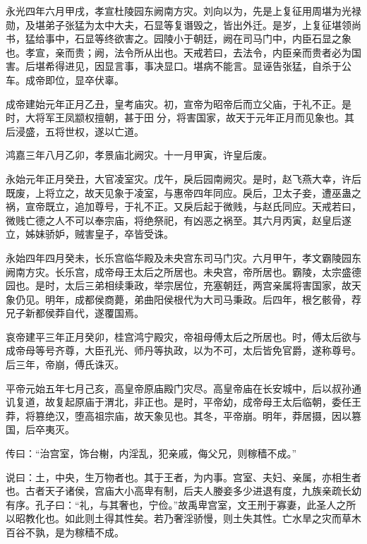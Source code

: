 \documentclass[12pt,UTF8]{ctexbook}
\begin{document}
永光四年六月甲戌，孝宣杜陵园东阙南方灾。刘向以为，先是上复征用周堪为光禄勋，及堪弟子张猛为太中大夫，石显等复谮毁之，皆出外迁。是岁，上复征堪领尚书，猛给事中，石显等终欲害之。园陵小于朝廷，阙在司马门中，内臣石显之象也。孝宣，亲而贵；阙，法令所从出也。天戒若曰，去法令，内臣亲而贵者必为国害。后堪希得进见，因显言事，事决显口。堪病不能言。显诬告张猛，自杀于公车。成帝即位，显卒伏辜。



成帝建始元年正月乙丑，皇考庙灾。初，宣帝为昭帝后而立父庙，于礼不正。是时，大将军王凤颛权擅朝，甚于田分，将害国家，故天于元年正月而见象也。其后浸盛，五将世权，遂以亡道。



鸿嘉三年八月乙卯，孝景庙北阙灾。十一月甲寅，许皇后废。



永始元年正月癸丑，大官凌室灾。戊午，戾后园南阙灾。是时，赵飞燕大幸，许后既废，上将立之，故天见象于凌室，与惠帝四年同应。戾后，卫太子妾，遭巫蛊之祸，宣帝既立，追加尊号，于礼不正。又戾后起于微贱，与赵氏同应。天戒若曰，微贱亡德之人不可以奉宗庙，将绝祭祀，有凶恶之祸至。其六月丙寅，赵皇后遂立，姊妹骄妒，贼害皇子，卒皆受诛。



永始四年四月癸未，长乐宫临华殿及未央宫东司马门灾。六月甲午，孝文霸陵园东阙南方灾。长乐宫，成帝母王太后之所居也。未央宫，帝所居也。霸陵，太宗盛德园也。是时，太后三弟相续秉政，举宗居位，充塞朝廷，两宫亲属将害国家，故天象仍见。明年，成都侯商薨，弟曲阳侯根代为大司马秉政。后四年，根乞骸骨，荐兄子新都侯莽自代，遂覆国焉。



哀帝建平三年正月癸卯，桂宫鸿宁殿灾，帝祖母傅太后之所居也。时，傅太后欲与成帝母等号齐尊，大臣孔光、师丹等执政，以为不可，太后皆免官爵，遂称尊号。后三年，帝崩，傅氏诛灭。



平帝元始五年七月己亥，高皇帝原庙殿门灾尽。高皇帝庙在长安城中，后以叔孙通讥复道，故复起原庙于渭北，非正也。是时，平帝幼，成帝母王太后临朝，委任王莽，将篡绝汉，堕高祖宗庙，故天象见也。其冬，平帝崩。明年，莽居摄，因以篡国，后卒夷灭。



传曰：“治宫室，饰台榭，内淫乱，犯亲戚，侮父兄，则稼穑不成。”



说曰：土，中央，生万物者也。其于王者，为内事。宫室、夫妇、亲属，亦相生者也。古者天子诸侯，宫庙大小高卑有制，后夫人媵妾多少进退有度，九族亲疏长幼有序。孔子曰：“礼，与其奢也，宁俭。”故禹卑宫室，文王刑于寡妻，此圣人之所以昭教化也。如此则土得其性矣。若乃奢淫骄慢，则土失其性。亡水旱之灾而草木百谷不孰，是为稼穑不成。
\end{document}
